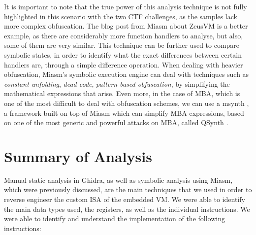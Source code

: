 It is important to note that the true power of this analysis technique is not fully highlighted in this scenario with the two \gls{CTF} challenges, as the samples lack more complex obfuscation. The blog post from Miasm about ZeusVM \cite{zeusvm_miasm} is a better example, as there are considerably more function handlers to analyse, but also, some of them are very similar. This technique can be further used to compare symbolic states, in order to identify what the exact differences between certain handlers are, through a simple difference operation. When dealing with heavier obfuscation, Miasm's symbolic execution engine can deal with techniques such as \emph{constant unfolding}, \emph{dead code}, \emph{pattern based-obfuscation}, by simplifying the mathematical expressions that arise. Even more, in the case of \gls{MBA}, which is one of the most difficult to deal with obfuscation schemes, we can use a msynth \cite{msynth}, a framework built on top of Miasm which can simplify \gls{MBA} expressions, based on one of the most generic and powerful attacks on \gls{MBA}, called QSynth \cite{qsynth}.

\section{Summary of Analysis}

Manual static analysis in Ghidra, as well as symbolic analysis using Miasm, which were previously discussed, are the main techniques that we used in order to reverse engineer the custom \gls{ISA} of the embedded \gls{VM}. We were able to identify the main data types used, the registers, as well as the individual instructions. We were able to identify and understand the implementation of the following instructions: 

